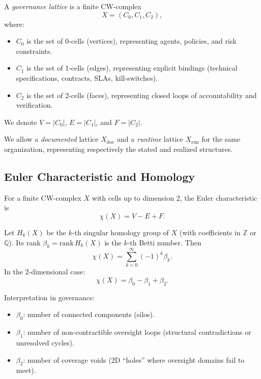 \documentclass[11pt]{article}
\begin{document}
\begin{definition}
A \emph{governance lattice} is a finite CW-complex
\[
X = (C_0, C_1, C_2),
\]
where:
\begin{itemize}
  \item \(C_0\) is the set of 0-cells (vertices), representing agents, policies, and risk constraints.
  \item \(C_1\) is the set of 1-cells (edges), representing explicit bindings (technical specifications, contracts, SLAs, kill-switches).
  \item \(C_2\) is the set of 2-cells (faces), representing closed loops of accountability and verification.
\end{itemize}
We denote \(V = |C_0|\), \(E = |C_1|\), and \(F = |C_2|\).
\end{definition}

We allow a \emph{documented} lattice \(X_{\mathrm{doc}}\) and a \emph{runtime} lattice \(X_{\mathrm{run}}\) for the same organization, representing respectively the stated and realized structures.

\subsection{Euler Characteristic and Homology}

\begin{definition}
For a finite CW-complex \(X\) with cells up to dimension \(2\), the Euler characteristic is
\[
\chi(X) = V - E + F.
\]
\end{definition}

\begin{definition}
Let \(H_k(X)\) be the \(k\)-th singular homology group of \(X\) (with coefficients in \(\mathbb{Z}\) or \(\mathbb{Q}\)). Its rank \(\beta_k = \mathrm{rank}\,H_k(X)\) is the \(k\)-th Betti number. Then
\[
\chi(X) = \sum_{k=0}^{\infty} (-1)^k \beta_k.
\]
In the 2-dimensional case:
\[
\chi(X) = \beta_0 - \beta_1 + \beta_2.
\]
\end{definition}

Interpretation in governance:
\begin{itemize}
  \item \(\beta_0\): number of connected components (silos).
  \item \(\beta_1\): number of non-contractible oversight loops (structural contradictions or unresolved cycles).
  \item \(\beta_2\): number of coverage voids (2D “holes” where oversight domains fail to meet).
\end{itemize}
\end{document}
